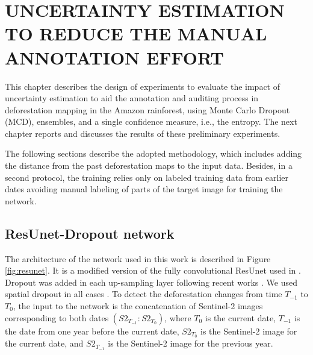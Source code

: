 \chapter{UNCERTAINTY ESTIMATION TO REDUCE THE MANUAL ANNOTATION EFFORT }\label{sect:Methodology}
This chapter describes the design of experiments to evaluate the impact of uncertainty estimation to aid the annotation and auditing process in deforestation mapping in the Amazon rainforest, using Monte Carlo Dropout (MCD), ensembles, and a single confidence measure, i.e., the entropy. The next chapter reports and discusses the results of these preliminary experiments. 

The following sections describe the adopted methodology, which includes adding the distance from the past deforestation maps to the input data. Besides, in a second protocol, the training relies only on labeled training data from earlier dates avoiding manual labeling of parts of the target image for training the network.%


\section{ResUnet-Dropout network}
The architecture of the network used in this work is described in Figure \ref{fig:resunet}. It is a modified version of the fully convolutional ResUnet used in \cite{ortega2021comparison}. Dropout was added in each up-sampling layer following recent works \cite{dechesne2021bayesian, nguyen2021comparison, kwon2020uncertainty}. We used spatial dropout in all cases \cite{lee2020revisiting}. To detect the deforestation changes from time $T_{-1}$ to $T_0$, the input to the network is the concatenation of Sentinel-2 images corresponding to both dates $(S2_{T_{-1}}:S2_{T_{0}})$, where $T_0$ is the current date, $T_{-1}$ is the date from one year before the current date, $S2_{T_{0}}$ is the Sentinel-2 image for the current date, and $S2_{T_{-1}}$  is the Sentinel-2 image for the previous year.

